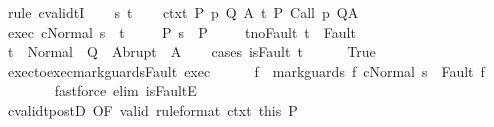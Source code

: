 \begin{isabellebody}
%
\isadelimproof
%
\endisadelimproof
%
\isatagproof
{}\isamarkupfalse%
\ {\isacharparenleft}rule\ cvalidtI{\isacharparenright}\isanewline
\ \ \isamarkupfalse%
\ s\ t\isanewline
\ \ \isamarkupfalse%
\ ctxt{\isacharcolon}\ {\isachardoublequoteopen}{\isasymforall}{\isacharparenleft}P{\isacharcomma}\ p{\isacharcomma}\ Q{\isacharcomma}\ A{\isacharparenright}{\isasymin}{\isasymTheta}{\isachardot}\ {\isasymGamma}{\isasymTurnstile}\isactrlsub t\isactrlbsub {\isacharslash}{\isacharbraceleft}{\isacharbraceright}\isactrlesub \ P\ {\isacharparenleft}Call\ p{\isacharparenright}\ Q{\isacharcomma}A{\isachardoublequoteclose}\ \isanewline
\ \ \isamarkupfalse%
\ exec{\isacharcolon}\ {\isachardoublequoteopen}{\isasymGamma}{\isasymturnstile}{\isasymlangle}c{\isacharcomma}Normal\ s{\isasymrangle}\ {\isasymRightarrow}\ t{\isachardoublequoteclose}\ \isanewline
\ \ \isamarkupfalse%
\ P{\isacharcolon}\ {\isachardoublequoteopen}s\ {\isasymin}\ P{\isachardoublequoteclose}\ \isanewline
\ \ \isamarkupfalse%
\ t{\isacharunderscore}noFault{\isacharcolon}\ {\isachardoublequoteopen}t\ {\isasymnotin}\ Fault\ {\isacharbackquote}\ {\isacharbraceleft}{\isacharbraceright}{\isachardoublequoteclose}\isanewline
\ \ \isamarkupfalse%
\ {\isachardoublequoteopen}t\ {\isasymin}\ Normal\ {\isacharbackquote}\ Q\ {\isasymunion}\ Abrupt\ {\isacharbackquote}\ A{\isachardoublequoteclose}\isanewline
\ \ \isamarkupfalse%
\ {\isacharparenleft}cases\ {\isachardoublequoteopen}isFault\ t{\isachardoublequoteclose}{\isacharparenright}\isanewline
\ \ \ \ \isamarkupfalse%
\ True\isanewline
\ \ \ \ \isamarkupfalse%
\ exec{\isacharunderscore}to{\isacharunderscore}exec{\isacharunderscore}mark{\isacharunderscore}guards{\isacharunderscore}Fault\ exec\isanewline
\ \ \ \ \isamarkupfalse%
\ f{\isacharprime}\ \ {\isachardoublequoteopen}{\isasymGamma}{\isasymturnstile}{\isasymlangle}mark{\isacharunderscore}guards\ f\ c{\isacharcomma}Normal\ s{\isasymrangle}\ {\isasymRightarrow}\ Fault\ f{\isacharprime}{\isachardoublequoteclose}\isanewline
\ \ \ \ \ \ \isamarkupfalse%
\ {\isacharparenleft}fastforce\ elim{\isacharcolon}\ isFaultE{\isacharparenright}\isanewline
\ \ \ \ \isamarkupfalse%
\ cvalidt{\isacharunderscore}postD\ {\isacharbrackleft}OF\ valid\ {\isacharbrackleft}rule{\isacharunderscore}format{\isacharbrackright}\ ctxt\ this\ P{\isacharbrackright}\isanewline
\ \ \ \ \isamarkupfalse%

\end{isabellebody}
